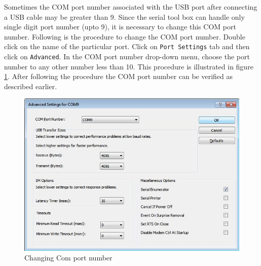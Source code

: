 Sometimes the COM port number associated with the USB port after connecting a USB cable may be greater than 9. Since the serial tool box can handle only single digit port number (upto 9), it is necessary to change this COM port number. Following is the procedure to change the COM port number.
Double click on the name of the particular port. Click on { \tt Port Settings} tab and then click on { \tt Advanced}. In the COM port number drop-down menu, choose the port number to any other number less than 10. This procedure is illustrated in figure \ref{com_change}. After following the procedure the COM port number can be verified as described earlier.
\begin{figure}
\centering
\includegraphics[width=0.7\linewidth]{using-sbhs/port2.jpg}
\caption{Changing Com port number}
\label{com_change}
\end{figure}
